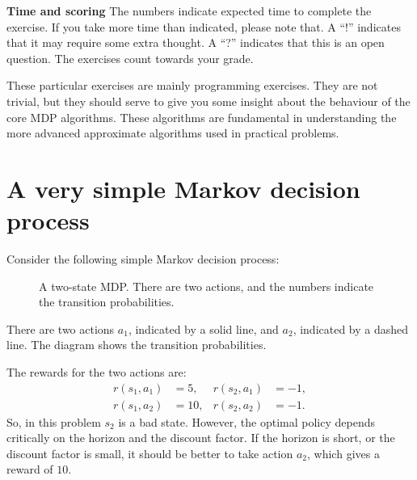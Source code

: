 \documentclass[twoside,a4paper]{article}
\begin{document}
\textbf{Time and scoring} The numbers indicate expected time to complete the exercise. If you take more time than indicated, please note that. A ``!'' indicates that it may require some extra thought. A ``?'' indicates that this is an open question. The exercises count towards your grade.

These particular exercises are mainly programming exercises. They are not trivial, but they should serve to give you some insight about the behaviour of the core MDP algorithms. These algorithms are fundamental in understanding the more advanced approximate algorithms used in practical problems.

\section{A very simple Markov decision process}
Consider the following simple Markov decision process:
\begin{figure}[h]
  \centering
  \caption{A two-state MDP. There are two actions, and the numbers indicate the transition probabilities.}
  \label{fig:two-state-mdp}
\end{figure}
There are two actions $a_1$, indicated by a solid line, and $a_2$, indicated by a dashed line. The diagram shows the transition probabilities. 

The rewards for the two actions are:
\begin{align}
  \label{eq:1}
  r(s_1, a_1) &= 5, & r(s_2, a_1) &= -1,
  \\
  r(s_1, a_2) &= 10, & r(s_2, a_2) &= -1.
\end{align}
So, in this problem $s_2$ is a bad state. However, the optimal policy depends critically on the horizon and the discount factor. If the horizon is short, or the discount factor is small, it should be better to take action $a_2$, which gives a reward of $10$.
\end{document}
